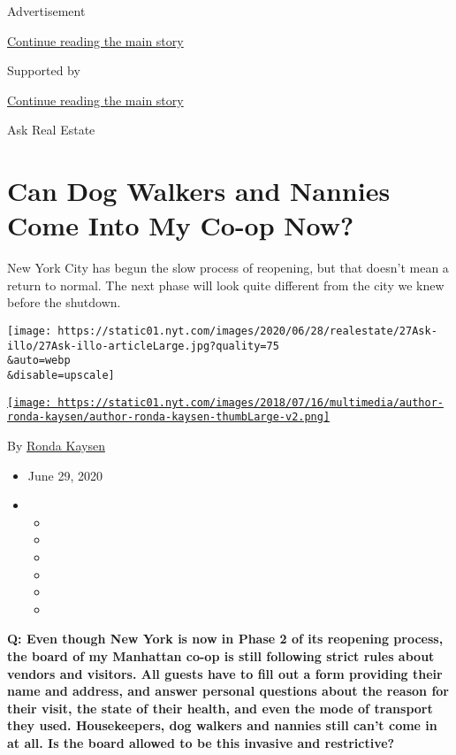 Advertisement

\protect\hyperlink{after-top}{Continue reading the main story}

Supported by

\protect\hyperlink{after-sponsor}{Continue reading the main story}

Ask Real Estate

\hypertarget{can-dog-walkers-and-nannies-come-into-my-co-op-now}{%
\section{Can Dog Walkers and Nannies Come Into My Co-op
Now?}\label{can-dog-walkers-and-nannies-come-into-my-co-op-now}}

New York City has begun the slow process of reopening, but that doesn't
mean a return to normal. The next phase will look quite different from
the city we knew before the shutdown.

\texttt{[image: https://static01.nyt.com/images/2020/06/28/realestate/27Ask-illo/27Ask-illo-articleLarge.jpg?quality=75\\\&auto=webp\\\&disable=upscale]}

\href{https://www.nytimes.com/by/ronda-kaysen}{\texttt{[image: https://static01.nyt.com/images/2018/07/16/multimedia/author-ronda-kaysen/author-ronda-kaysen-thumbLarge-v2.png]}}

By \href{https://www.nytimes.com/by/ronda-kaysen}{Ronda Kaysen}

\begin{itemize}
\item
  June 29, 2020
\item
  \begin{itemize}
  \item
  \item
  \item
  \item
  \item
  \item
  \end{itemize}
\end{itemize}

\textbf{Q: Even though New York is now in Phase 2 of its reopening
process, the board of my Manhattan co-op is still following strict rules
about vendors and visitors. All guests have to fill out a form providing
their name and address, and answer personal questions about the reason
for their visit, the state of their health, and even the mode of
transport they used. Housekeepers, dog walkers and nannies still can't
come in at all. Is the board allowed to be this invasive and
restrictive?}

